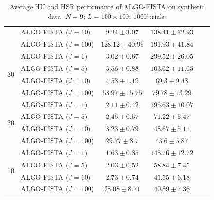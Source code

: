 \begin{table}[h]
\begin{adjustbox}{max width=\textwidth}
\begin{tabular}{|c|l|c|c|c|c|}
                    & ALGO-FISTA ($J=10$)           & $9.24     \pm 3.07$   & $138.41   \pm 32.93$ \tabularnewline
                    & ALGO-FISTA ($J=100$)          & $128.12   \pm 40.99$  & $191.93   \pm 41.84$ \tabularnewline \cline{1-4}
\multirow{4}{*}{30} & ALGO-FISTA ($J=1$)            & $3.02     \pm 0.67$   & $299.52   \pm 26.05$ \tabularnewline
                    & ALGO-FISTA ($J=5$)            & $3.56     \pm 0.88$   & $103.62   \pm 11.65$ \tabularnewline
                    & ALGO-FISTA ($J=10$)           & $4.58     \pm 1.19$   & $69.3     \pm 9.48$  \tabularnewline
                    & ALGO-FISTA ($J=100$)          & $53.97    \pm 15.75$  & $79.78    \pm 13.29$ \tabularnewline \cline{1-4}
\multirow{4}{*}{20} & ALGO-FISTA ($J=1$)            & $2.11     \pm 0.42$   & $195.63   \pm 10.07$ \tabularnewline
                    & ALGO-FISTA ($J=5$)            & $2.46     \pm 0.57$   & $71.22    \pm 5.47$  \tabularnewline
                    & ALGO-FISTA ($J=10$)           & $3.23     \pm 0.79$   & $48.67    \pm 5.11$  \tabularnewline
                    & ALGO-FISTA ($J=100$)          & $29.77    \pm 8.7$    & $43.6     \pm 5.87$  \tabularnewline \cline{1-4}
\multirow{4}{*}{10} & ALGO-FISTA ($J=1$)            & $1.63     \pm 0.35$   & $148.76   \pm 12.72$ \tabularnewline
                    & ALGO-FISTA ($J=5$)            & $2.03     \pm 0.52$   & $58.84    \pm 7.45$  \tabularnewline
                    & ALGO-FISTA ($J=10$)           & $2.73     \pm 0.74$   & $41.55    \pm 6.18$  \tabularnewline
                    & ALGO-FISTA ($J=100$)          & $28.08    \pm 8.71$   & $40.89    \pm 7.36$  \tabularnewline \cline{1-4}
\end{tabular}
\end{adjustbox}
\caption{Average HU and HSR performance of ALGO-FISTA on synthetic data.
         $N = 9$; $L = 100 \times 100$; $1000$ trials.}
\label{table:results_full_FISTA_MO9}
\end{table}

\newpage

